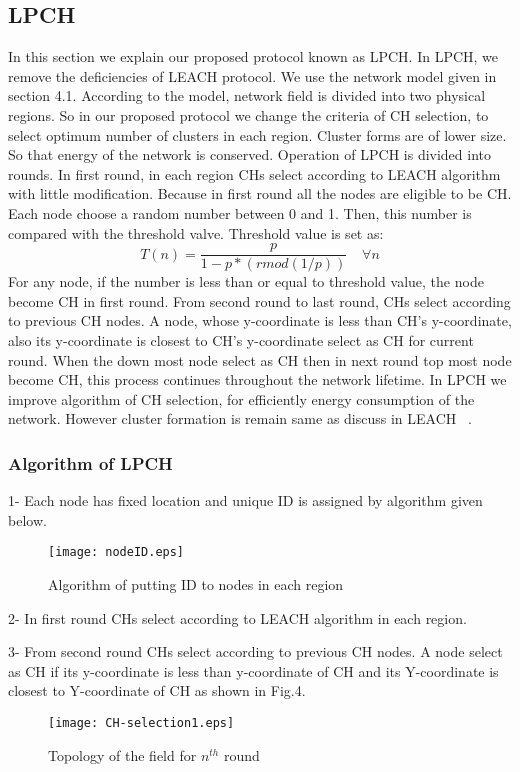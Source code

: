 \documentclass[journal]{IEEEtran}
\begin{document}
\subsection{LPCH}
In this section we explain our proposed protocol known as LPCH. In LPCH, we remove the deficiencies of LEACH protocol. We use the network model given in section 4.1. According to the model, network field is divided into two physical regions. So in our proposed protocol we change the criteria of CH selection, to select optimum number of clusters in each region. Cluster forms are of lower size. So that energy of the network is conserved. Operation of LPCH is divided into rounds. In first round, in each region CHs select according to LEACH algorithm with little modification. Because in first round all the nodes are eligible to be CH. Each node choose a random number between 0 and 1. Then, this number is compared with the threshold valve. Threshold value is set as:
\begin{equation}
T(n)=\frac{p}{1-p*(rmod(1/p))} \,\,\,\,\,\ \forall n
\end{equation}
For any node, if the number is less than or equal to threshold value, the node become CH in first round. From second round to last round, CHs select according to previous CH nodes. A node, whose y-coordinate is less than CH's y-coordinate, also its y-coordinate is closest to CH's y-coordinate select as CH for current round. When the down most node select as CH then in next round top most node become CH, this process continues throughout the network lifetime. In LPCH we improve algorithm of CH selection, for efficiently energy consumption of the network. However cluster formation is remain same as discuss in LEACH ~\cite{heinzelman2000energy}.
\subsubsection{Algorithm of LPCH}
{1}- Each node has fixed location and unique ID is assigned by algorithm given below.
\begin{figure}[h]
\centering
\texttt{[image: nodeID.eps]}
\caption{Algorithm of putting ID to nodes in each region}
\end{figure}

{2}- In first round CHs select according to LEACH algorithm in each region.

{3}- From second round CHs select according to previous CH nodes. A node select as CH if its y-coordinate is less than y-coordinate of CH and its Y-coordinate is closest to Y-coordinate of CH as shown in Fig.4.
\begin{figure*}[t]
\centering
\texttt{[image: CH-selection1.eps]}
\caption{Topology of the field for $n^{th}$ round}
\end{figure*}
\end{document}
